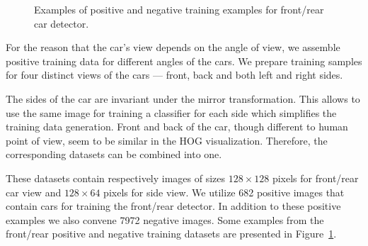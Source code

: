 \begin{figure}[b]
\hspace{2mm}
\hspace{2mm}
\hspace{2mm}
\hspace{2mm}
\caption{Examples of positive and negative training examples for front/rear car detector.}
\label{fig:pos_neg_examples}
\end{figure}

For the reason that the car's view depends on the angle of view, we assemble
positive training data for different angles of the cars. We prepare training
samples for four distinct views of the cars --- front, back and both left and
right sides.

The sides of the car are invariant under the mirror transformation. This
allows to use the same image for training a classifier for each side which
simplifies the training data generation. Front and back of the car, though
different to human point of view, seem to be similar in the HOG visualization.
Therefore, the corresponding datasets can be combined into one.

These datasets contain respectively images of sizes $128 \times 128$ pixels
for front/rear car view and $128 \times 64$ pixels for side view. We utilize
682 positive images that contain cars for training the front/rear detector. In
addition to these positive examples we also convene 7972 negative images. Some
examples from the front/rear positive and negative training datasets are
presented in Figure~\ref{fig:pos_neg_examples}.

